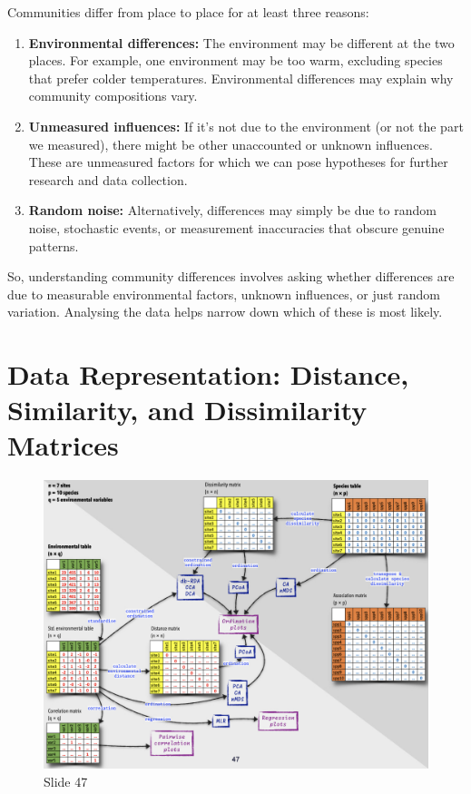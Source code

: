 \documentclass[
  11pt,
]{book}
\begin{document}
Communities differ from place to place for at least three reasons:

\begin{enumerate}
\def\labelenumi{\arabic{enumi}.}
\item
  \textbf{Environmental differences:} The environment may be different
  at the two places. For example, one environment may be too warm,
  excluding species that prefer colder temperatures. Environmental
  differences may explain why community compositions vary.
\item
  \textbf{Unmeasured influences:} If it's not due to the environment (or
  not the part we measured), there might be other unaccounted or unknown
  influences. These are unmeasured factors for which we can pose
  hypotheses for further research and data collection.
\item
  \textbf{Random noise:} Alternatively, differences may simply be due to
  random noise, stochastic events, or measurement inaccuracies that
  obscure genuine patterns.
\end{enumerate}

So, understanding community differences involves asking whether
differences are due to measurable environmental factors, unknown
influences, or just random variation. Analysing the data helps narrow
down which of these is most likely.

\section{Data Representation: Distance, Similarity, and Dissimilarity
Matrices}\label{data-representation-distance-similarity-and-dissimilarity-matrices}

\begin{figure}[ht]
\centering
\includegraphics[width=0.8\linewidth]{../images/BDC334/BDC334-047.jpeg}
\caption*{Slide 47}
\end{figure}
\end{document}
